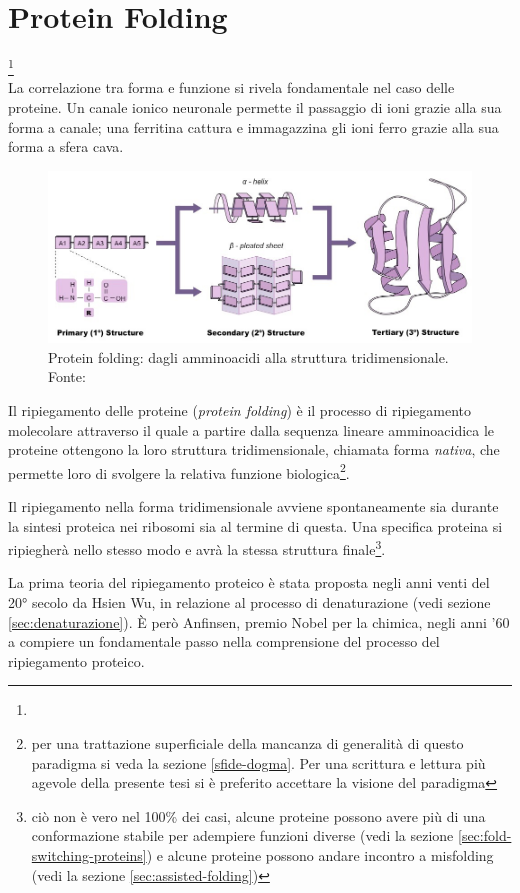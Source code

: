 \chapter{Protein Folding}
{
\footnote{}\\

La correlazione tra forma e funzione si rivela fondamentale nel caso delle proteine. Un canale ionico neuronale permette il passaggio di ioni grazie alla sua forma a canale; una ferritina cattura e immagazzina gli ioni ferro grazie alla sua forma a sfera cava. 

\begin{figure}[htp]
	\centering
	\includegraphics[scale=0.5]{images/protein-folding_med.jpeg}
	\caption{Protein folding: dagli amminoacidi alla struttura tridimensionale. Fonte: \cite{proteinStrucBioNinja}}
	\label{fig:protein-folding-bioninja}
\end{figure}

\par Il ripiegamento delle proteine (\textit{protein folding}) è il processo di ripiegamento molecolare attraverso il quale a partire dalla sequenza lineare amminoacidica le proteine ottengono la loro struttura tridimensionale, chiamata forma \textit{nativa}, che permette loro di svolgere la relativa funzione biologica\footnote{per una trattazione superficiale della mancanza di generalità di questo paradigma si veda la sezione \ref{sfide-dogma}. Per una scrittura e lettura più agevole della presente tesi si è preferito accettare la visione del paradigma}. 

\par Il ripiegamento nella forma tridimensionale avviene spontaneamente sia durante la sintesi proteica nei ribosomi sia al termine di questa. Una specifica proteina si ripiegherà nello stesso modo e avrà la stessa struttura finale\footnote{ciò non è vero nel 100\% dei casi, alcune proteine possono avere più di una conformazione stabile per adempiere funzioni diverse (vedi la sezione \ref{sec:fold-switching-proteins}) e alcune proteine possono andare incontro a misfolding (vedi la sezione \ref{sec:assisted-folding})}.

\par La prima teoria del ripiegamento proteico è stata proposta negli anni venti del 20° secolo da Hsien Wu\supercite{wu1931studies}, in relazione al processo di denaturazione (vedi sezione \ref{sec:denaturazione}). È però Anfinsen, premio Nobel per la chimica, negli anni '60 a compiere un fondamentale passo nella comprensione del processo del ripiegamento proteico\supercite{anfinsen1972formation}. 

}
